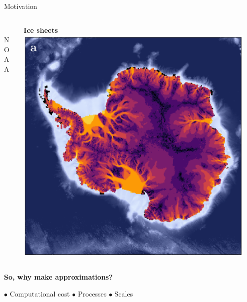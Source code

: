 \documentclass[aspectratio=169,xcolor=dvipsnames]{beamer}
\newcommand\credit[2]{
        \\ \vspace{-0.5em}
        {\color{gray}\scriptsize
        \hfill
        #1
        \hspace{#2}}
        }
\begin{document}
\begin{frame}[t]{Motivation}
\begin{columns}
\begin{column}{0.36\textwidth}
            \credit{NOAA}{3pt}
        \end{column}
        \begin{column}{0.32\textwidth}
            \centering
            \hspace{2em}\textbf{Ice sheets}
            \vspace{0.2cm} \newline
            \includegraphics[width=0.95\textwidth]{figs/Fig-Antarctica-surface-velocity-nolegend.png}
        \end{column}    
    \end{columns}

\hspace{5em}\textbf{So, why make approximations?}

\vspace{0.3cm}

\hspace{50pt}
$\bullet$ Computational cost
\hspace{10pt}
$\bullet$ Processes
\hspace{10pt}
$\bullet$ Scales

\end{frame}
\end{document}
